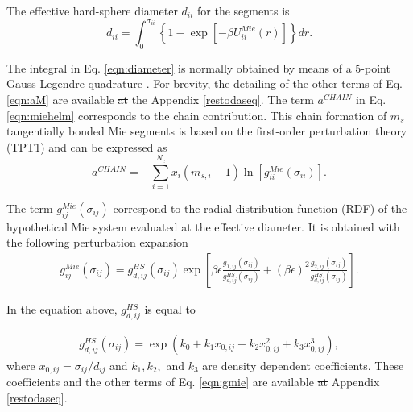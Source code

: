 \documentclass[
	12pt,				%
	openany,			%
	oneside,			%
	a4paper,			%
	english,			%
	brazil				%
	]{abntex2}
\providecommand{\DIFadd}[1]{{\protect\color{blue}\uwave{#1}}}
\providecommand{\DIFdel}[1]{{\protect\color{red}\sout{#1}}}
\providecommand{\DIFaddbegin}{}
\providecommand{\DIFaddend}{}
\providecommand{\DIFdelbegin}{}
\providecommand{\DIFdelend}{}
\providecommand{\DIFadd}[1]{{\protect\color{blue}\uwave{#1}}} %
\providecommand{\DIFdel}[1]{{\protect\color{red}\sout{#1}}}                      %
\providecommand{\DIFaddbegin}{} %
\providecommand{\DIFaddend}{} %
\providecommand{\DIFdelbegin}{} %
\providecommand{\DIFdelend}{} %
\begin{document}
The effective hard-sphere diameter $d_{ii}$ for the segments is
\begin{equation}
d_{ii} =\int_{0}^{\sigma_{ii}} \left \lbrace 1 - \exp \left [-\beta U^{Mie}_{ii}(r) \right ] \right \rbrace dr .
\label{eqn:diameter}
\end{equation}


The integral in Eq. \eqref{eqn:diameter} is normally obtained by means of a 5-point Gauss-Legendre quadrature \cite{papa2014}. For brevity, the detailing of the other terms of Eq. \eqref{eqn:aM} are available \DIFdelbegin \DIFdel{at }\DIFdelend \DIFaddbegin \DIFadd{in }\DIFaddend the Appendix \ref{restodaseq}. The term $a^{CHAIN}$ in Eq. \ref{eqn:miehelm} corresponds to the chain contribution. This chain formation of $m_{s}$ tangentially bonded Mie segments is based on the first-order perturbation theory (TPT1)  \cite{papa2014} and can be expressed as
\begin{equation}
a^{CHAIN} =-\sum_{i=1}^{N_{c}} x_{i}(m_{s,i} - 1)\ln \left [ g_{ii}^{Mie}(\sigma_{ii}) \right] .
\label{eqn:achain}
\end{equation}

The term $g_{ij}^{Mie}(\sigma_{ij})$ correspond to the radial distribution function (RDF) of the hypothetical Mie system evaluated at the effective diameter. It is obtained with the following perturbation expansion
\begin{equation}
\begin{aligned}
g_{ij}^{Mie}(\sigma_{ij}) =g_{d,ij}^{HS}(\sigma_{ij})\exp \left [\beta\epsilon \frac{g_{1,ij}(\sigma_{ij})}{g_{d,ij}^{HS}(\sigma_{ij})} + (\beta\epsilon)^{2} \frac{g_{2,ij}(\sigma_{ij})}{g_{d,ij}^{HS}(\sigma_{ij})} \right] .
\end{aligned}
\label{eqn:gmie}
\end{equation}


In the equation above, $g_{d,ij}^{HS}$ is equal to 

\begin{equation}
\begin{aligned}
g_{d,ij}^{HS}(\sigma_{ij}) = \exp (k_{0} + k_{1} x_{0,ij} + k_{2} x_{0,ij}^{2} + k_{3} x_{0,ij}^{3}) ,
\end{aligned}
\label{eqn:ghs}
\end{equation}
where $x_{0,ij} = \sigma_{ij}/d_{ij}$ and $k_{1}, k_{2},$ and $k_{3}$ are density dependent coefficients. These coefficients and the other terms of Eq. \ref{eqn:gmie} are available \DIFdelbegin \DIFdel{at }\DIFdelend \DIFaddbegin \DIFadd{in }\DIFaddend Appendix \ref{restodaseq}.  
\end{document}
